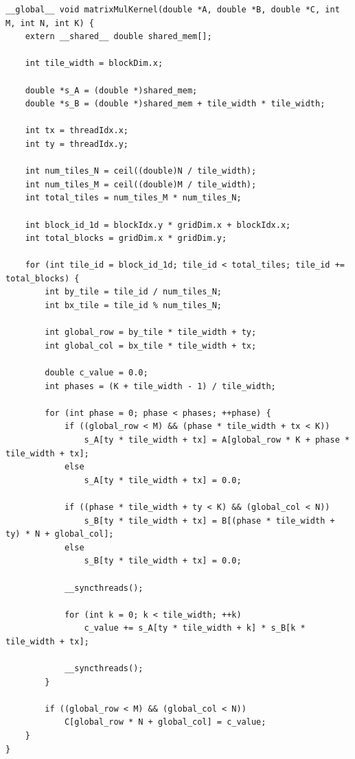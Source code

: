 \documentclass[a4paper]{article}
\begin{document}
\begin{lstlisting}[caption={Kernel CUDA generalizzato con tiling dinamico}, label={lst:4}]
__global__ void matrixMulKernel(double *A, double *B, double *C, int M, int N, int K) {
    extern __shared__ double shared_mem[];

    int tile_width = blockDim.x;

    double *s_A = (double *)shared_mem;
    double *s_B = (double *)shared_mem + tile_width * tile_width;

    int tx = threadIdx.x;
    int ty = threadIdx.y;

    int num_tiles_N = ceil((double)N / tile_width);
    int num_tiles_M = ceil((double)M / tile_width);
    int total_tiles = num_tiles_M * num_tiles_N;

    int block_id_1d = blockIdx.y * gridDim.x + blockIdx.x;
    int total_blocks = gridDim.x * gridDim.y;

    for (int tile_id = block_id_1d; tile_id < total_tiles; tile_id += total_blocks) {
        int by_tile = tile_id / num_tiles_N;
        int bx_tile = tile_id % num_tiles_N;

        int global_row = by_tile * tile_width + ty;
        int global_col = bx_tile * tile_width + tx;

        double c_value = 0.0;
        int phases = (K + tile_width - 1) / tile_width;

        for (int phase = 0; phase < phases; ++phase) {
            if ((global_row < M) && (phase * tile_width + tx < K))
                s_A[ty * tile_width + tx] = A[global_row * K + phase * tile_width + tx];
            else
                s_A[ty * tile_width + tx] = 0.0;

            if ((phase * tile_width + ty < K) && (global_col < N))
                s_B[ty * tile_width + tx] = B[(phase * tile_width + ty) * N + global_col];
            else
                s_B[ty * tile_width + tx] = 0.0;

            __syncthreads();

            for (int k = 0; k < tile_width; ++k)
                c_value += s_A[ty * tile_width + k] * s_B[k * tile_width + tx];

            __syncthreads();
        }

        if ((global_row < M) && (global_col < N))
            C[global_row * N + global_col] = c_value;
    }
}
\end{lstlisting}
\end{document}
